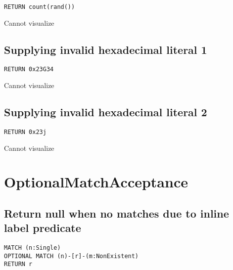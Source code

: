 \begin{lstlisting}
RETURN count(rand())
\end{lstlisting}

Cannot visualize
\subsection{Supplying invalid hexadecimal literal 1}

\begin{lstlisting}
RETURN 0x23G34
\end{lstlisting}

Cannot visualize
\subsection{Supplying invalid hexadecimal literal 2}

\begin{lstlisting}
RETURN 0x23j
\end{lstlisting}

Cannot visualize
\section{OptionalMatchAcceptance}

\subsection{Return null when no matches due to inline label predicate}

\begin{lstlisting}
MATCH (n:Single)
OPTIONAL MATCH (n)-[r]-(m:NonExistent)
RETURN r
\end{lstlisting}

